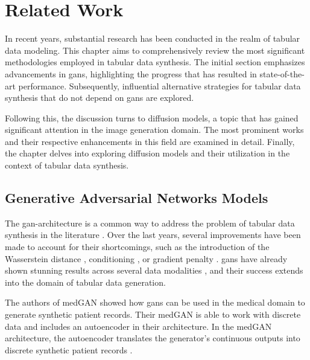 \chapter{Related Work}
\label{ch:relatedWork}

In recent years, substantial research has been conducted in the realm of tabular data modeling. 
This chapter aims to comprehensively review the most significant methodologies employed in tabular data synthesis. 
The initial section emphasizes advancements in \glspl{gan}, highlighting the progress that has resulted in state-of-the-art performance. 
Subsequently, influential alternative strategies for tabular data synthesis that do not depend on \glspl{gan} are explored.

Following this, the discussion turns to diffusion \glspl{model}, a topic that has gained significant attention in the image generation domain. 
The most prominent works and their respective enhancements in this field are examined in detail.
Finally, the chapter delves into exploring diffusion \glspl{model} and their utilization in the context of tabular data synthesis.

\section{Generative Adversarial Networks Models}
\label{ch:relatedWork-generativeAdversarialNetworksModels}

The \gls{gan}-architecture is a common way to address the problem of tabular data synthesis in the literature \cite{borisov2022DeepNeuralNetworks}.
Over the last years, several improvements have been made to account for their shortcomings, such as the introduction of the Wasserstein \cite{frogner2015LearningWassersteinLoss} distance \cite{arjovsky2017WassersteinGenerativeAdversarial}, conditioning \cite{mirza2014ConditionalGenerativeAdversarial}, or gradient penalty \cite{gulrajani2017ImprovedTrainingWasserstein}.
\Glspl{gan} have already shown stunning results across several data modalities \cite{mckeever2020SynthesisingTabularDatasets}, and their success extends into the domain of tabular data generation.

The authors of medGAN \cite{choi2017GeneratingMultilabelDiscrete} showed how \glspl{gan} can be used in the medical domain to generate synthetic patient records.
Their medGAN is able to work with discrete data and includes an autoencoder in their architecture.
In the medGAN architecture, the autoencoder translates the generator's continuous outputs into discrete synthetic patient records \cite{choi2017GeneratingMultilabelDiscrete}.

